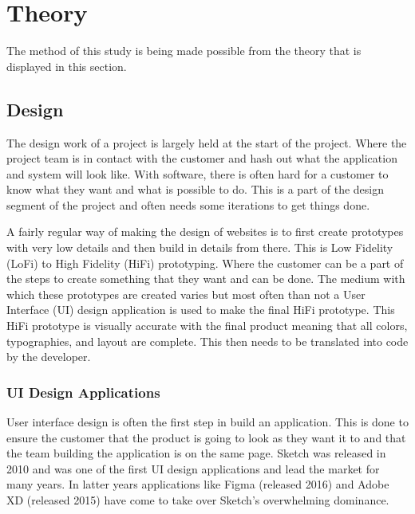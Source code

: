 \section{Theory}

The method of this study is being made possible from the theory that is displayed in this section. 






\subsection{Design}%
\label{sub:Design}
The design work of a project is largely held at the start of the project. Where the project team is in contact with the customer and hash out what the application and system will look like. With software, there is often hard for a customer to know what they want and what is possible to do. This is a part of the design segment of the project and often needs some iterations to get things done. 

A fairly regular way of making the design of websites is to first create prototypes with very low details and then build in details from there. This is Low Fidelity (LoFi) to High Fidelity (HiFi) prototyping. Where the customer can be a part of the steps to create something that they want and can be done. The medium with which these prototypes are created varies but most often than not a User Interface (UI) design application is used to make the final HiFi prototype. This HiFi prototype is visually accurate with the final product meaning that all colors, typographies, and layout are complete. This then needs to be translated into code by the developer.

\subsubsection{UI Design Applications}%
\label{ssub:Apps}
User interface design is often the first step in build an application. This is done to ensure the customer that the product is going to look as they want it to and that the team building the application is on the same page. Sketch \cite{sketchDigitalDesignToolkit} was released in 2010 and was one of the first UI design applications and lead the market for many years. In latter years applications like Figma \cite{figmaFigmaCollaborativeInterface} (released 2016) and Adobe XD \cite{adobeAdobeXDFast}(released 2015) have come to take over Sketch's overwhelming dominance. 

